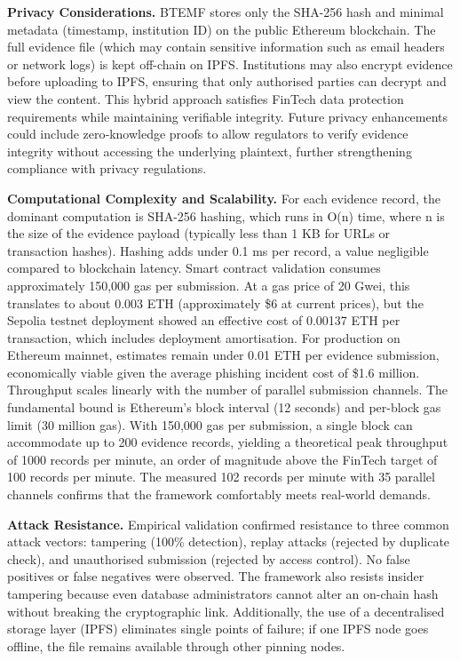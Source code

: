 \documentclass[conference]{IEEEtran}
\begin{document}
\textbf{Privacy Considerations.} BTEMF stores only the SHA-256 hash and minimal metadata (timestamp, institution ID) on the public Ethereum blockchain. The full evidence file (which may contain sensitive information such as email headers or network logs) is kept off-chain on IPFS. Institutions may also encrypt evidence before uploading to IPFS, ensuring that only authorised parties can decrypt and view the content. This hybrid approach satisfies FinTech data protection requirements while maintaining verifiable integrity. Future privacy enhancements could include zero‑knowledge proofs to allow regulators to verify evidence integrity without accessing the underlying plaintext, further strengthening compliance with privacy regulations.

\textbf{Computational Complexity and Scalability.} For each evidence record, the dominant computation is SHA-256 hashing, which runs in O(n) time, where n is the size of the evidence payload (typically less than 1 KB for URLs or transaction hashes). Hashing adds under 0.1 ms per record, a value negligible compared to blockchain latency. Smart contract validation consumes approximately 150,000 gas per submission. At a gas price of 20 Gwei, this translates to about 0.003 ETH (approximately \$6 at current prices), but the Sepolia testnet deployment showed an effective cost of 0.00137 ETH per transaction, which includes deployment amortisation. For production on Ethereum mainnet, estimates remain under 0.01 ETH per evidence submission, economically viable given the average phishing incident cost of \$1.6 million. Throughput scales linearly with the number of parallel submission channels. The fundamental bound is Ethereum's block interval (12 seconds) and per-block gas limit (30 million gas). With 150,000 gas per submission, a single block can accommodate up to 200 evidence records, yielding a theoretical peak throughput of 1000 records per minute, an order of magnitude above the FinTech target of 100 records per minute. The measured 102 records per minute with 35 parallel channels confirms that the framework comfortably meets real-world demands.

\textbf{Attack Resistance.} Empirical validation confirmed resistance to three common attack vectors: tampering (100\% detection), replay attacks (rejected by duplicate check), and unauthorised submission (rejected by access control). No false positives or false negatives were observed. The framework also resists insider tampering because even database administrators cannot alter an on-chain hash without breaking the cryptographic link. Additionally, the use of a decentralised storage layer (IPFS) eliminates single points of failure; if one IPFS node goes offline, the file remains available through other pinning nodes.
\end{document}
